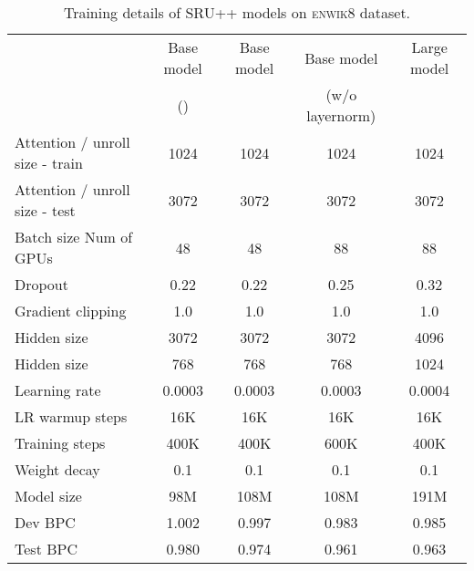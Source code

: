 \documentclass[11pt,a4paper]{article}
\begin{document}
\begin{table*}[!h]
\centering
\begin{tabular}{lcccc}
\hline
 & Base model & Base model & Base model & Large model \\
 & () & & (w/o layernorm) & \\
\hline
Attention / unroll size - train & 1024 & 1024 & 1024 & 1024 \\
Attention / unroll size - test & 3072 & 3072 & 3072 & 3072 \\
Batch size  Num of GPUs & 48 & 48 & 88 & 88 \\
Dropout & 0.22 & 0.22 & 0.25 & 0.32 \\
Gradient clipping & 1.0 & 1.0 & 1.0 & 1.0 \\
Hidden size  & 3072 & 3072 & 3072 & 4096 \\
Hidden size  & 768 & 768 & 768 & 1024 \\
Learning rate & 0.0003 & 0.0003 & 0.0003 & 0.0004 \\
LR warmup steps & 16K & 16K & 16K & 16K \\
Training steps & 400K & 400K & 600K & 400K \\
Weight decay & 0.1 & 0.1 & 0.1 & 0.1 \\
\hline
Model size & 98M & 108M & 108M & 191M \\
Dev BPC & 1.002 & 0.997 & 0.983 & 0.985 \\
Test BPC & 0.980 & 0.974 & 0.961 & 0.963\\
\bottomrule
\end{tabular}
\caption{Training details of SRU++ models on \textsc{enwik8} dataset.}
\label{tab:config_enwik8}
\end{table*}
\end{document}
